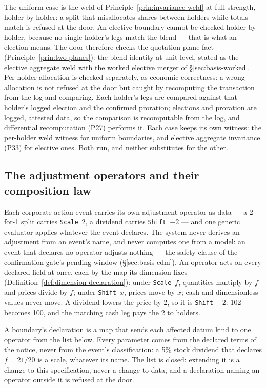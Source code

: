 The uniform case is the weld of Principle~\ref{prin:invariance-weld} at full
strength, holder by holder: a split that misallocates shares between holders
while totals match is refused at the door. An elective boundary cannot be
checked holder by holder, because no single holder's legs match the blend ---
that is what an election means. The door therefore checks the quotation-plane
fact (Principle~\ref{prin:two-planes}): the blend identity at unit level,
stated as the elective aggregate weld with the worked elective merger of
\S\ref{sec:basis-worked}. Per-holder allocation is checked separately, as
economic correctness: a wrong allocation is not refused at the door but
caught by recomputing the transaction from the log and comparing. Each
holder's legs are compared
against that holder's logged election and the confirmed proration; elections
and proration are logged, attested data, so the comparison is recomputable
from the log, and differential recomputation (P27) performs it. Each case
keeps its own witness: the per-holder weld witness for uniform boundaries,
and elective aggregate invariance (P33) for elective ones. Both run, and
neither substitutes for the other.

\subsection{The adjustment operators and their composition law}
\label{sec:basis-operators}

Each corporate-action event carries its own adjustment operator as data --- a 2-for-1
split carries \texttt{Scale}~$2$, a  dividend carries \texttt{Shift}~$-2$ ---
and one generic evaluator applies whatever the event declares. The system never
derives an adjustment from an event's name, and never computes one from a model: an
event that declares no operator adjusts nothing --- the safety clause of the
confirmation gate's pending window (\S\ref{sec:basis-cdm}). An operator acts on every declared
field at once, each by the map its dimension fixes
(Definition~\ref{def:dimension-declaration}): under \texttt{Scale}~$f$, quantities
multiply by $f$ and prices divide by $f$; under \texttt{Shift}~$x$, prices move by
$x$; cash and dimensionless values never move. A  dividend lowers the price by 2, so
it is \texttt{Shift}~$-2$: 102 becomes 100, and the matching cash leg pays the 2 to
holders.

\begin{definition}
\label{def:opspec}
A boundary's declaration is a map that sends each affected datum kind to one operator
from the list below. Every parameter comes from the declared terms of the notice,
never from the event's classification: a 5\% stock dividend that declares $f=21/20$
is a scale, whatever its name. The list is closed: extending it is a change to this
specification, never a change to data, and a declaration naming an operator outside
it is refused at the door.
\end{definition}

